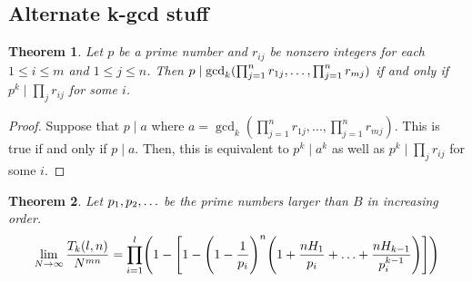 \documentclass[10pt,a4paper]{article}
\newtheorem{theorem}{Theorem}[section]
\theoremstyle{definition}
\theoremstyle{remark}
\begin{document}

\subsection{Alternate k-gcd stuff}

\begin{theorem} Let $p$ be a prime number and $r_{ij}$ be nonzero integers for each $1 \leq i \leq m$ and $1 \leq j \leq n$. Then
$p \mid \gcd_k(\prod_{j=1}^{n}r_{1j},\mathellipsis,\prod_{j=1}^n r_{mj})$ if and only if $p^k \mid \prod_{j}r_{ij}$ for some $i$.
\end{theorem}

\begin{proof}
Suppose that $p \mid a$ where $a = \gcd_k(\prod_{j=1}^n r_{1j}, ...,\prod_{j=1}^n r_{mj})$. This is true if and only if $p \mid a$. Then, this is equivalent to $p^k \mid a^k$ as well as $p^k \mid \prod_j r_{ij}$ for some $i$.
\end{proof}
 
	\begin{theorem}
		Let \(p_1, p_2,\mathellipsis\) be the prime numbers larger than \(B\) in increasing order.
		\begin{equation}
			\lim\limits_{N\to\infty} \frac{T_k(l,n)}{N^{mn}}=\prod_{i=1}^l\Biggl(1-\Biggl[1-\Biggl(1-\frac{1}{p_i}\Biggr)^n\Biggl(1+\frac{nH_1}{p_i}+\mathellipsis+\frac{nH_{k-1}}{p_i^{k-1}}\Biggr)\Biggr]\Biggr)
		\end{equation}
	\end{theorem}
\end{document}
